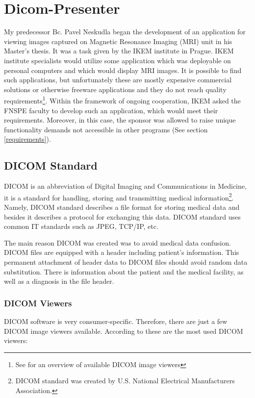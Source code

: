 \chapter{Dicom-Presenter}
\vspace{-10mm}
My predecessor Bc. Pavel Neskudla began the development of an application for viewing images captured on Magnetic Resonance Imaging (MRI) unit in his Master's thesis\cite{neskudla}. It was a task given by the IKEM institute in Prague. IKEM institute specialists would utilize some application which was deployable on personal computers and which would display MRI images. It is possible to find such applications, but unfortunately these are mostly expensive commercial solutions or otherwise freeware applications and they do not reach quality requirements\footnote{See \cite[page~9]{flaska_bc} for an overview of available DICOM image viewers}. Within the framework of ongoing cooperation, IKEM asked the FNSPE faculty to develop such an application, which would meet their requirements. Moreover, in this case, the sponsor was allowed to raise unique functionality demands not accessible in other programs (See section \ref{requirements}).

\section{DICOM Standard}

DICOM is an abbreviation of Digital Imaging and Communications in Medicine, it is a standard for handling, storing and transmitting medical information\footnote{DICOM standard was created by  U.S. National Electrical Manufacturers Association.}. Namely, DICOM standard describes a file format for storing medical data and besides it describes a protocol for exchanging this data. DICOM standard uses common IT standards such as JPEG, TCP/IP, etc. \cite{dicombook}

The main reason DICOM was created was to avoid medical data confusion. DICOM files are equipped with a header including patient's information. This permanent attachment of header data to DICOM files should avoid random data substitution. There is information about the patient and the medical facility, as well as a diagnosis in the file header.

\subsection{DICOM Viewers}
\label{viewers}
DICOM software is very consumer-specific. Therefore, there are just a few DICOM image viewers available. According to  these are the most used DICOM viewers:

